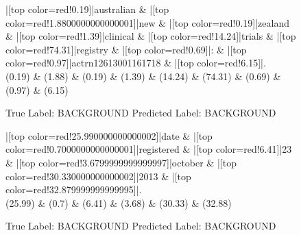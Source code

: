 \documentclass[a4paper, landscape]{article}
\begin{document}
\clearpage
\begin{figure}
\begin{center}
\begin{dependency}
\begin{deptext}
|[top color=red!0.19]|australian \& |[top color=red!1.8800000000000001]|new \& |[top color=red!0.19]|zealand \& |[top color=red!1.39]|clinical \& |[top color=red!14.24]|trials \& |[top color=red!74.31]|registry \& |[top color=red!0.69]|: \& |[top color=red!0.97]|actrn12613001161718 \& |[top color=red!6.15]|.\\
(0.19) \& (1.88) \& (0.19) \& (1.39) \& (14.24) \& (74.31) \& (0.69) \& (0.97) \& (6.15)\\
\end{deptext}
\end{dependency}
\end{center}
\caption{True Label: BACKGROUND Predicted Label: BACKGROUND}
\end{figure}
\clearpage
\begin{figure}
\begin{center}
\begin{dependency}
\begin{deptext}
|[top color=red!25.990000000000002]|date \& |[top color=red!0.7000000000000001]|registered \& |[top color=red!6.41]|23 \& |[top color=red!3.6799999999999997]|october \& |[top color=red!30.330000000000002]|2013 \& |[top color=red!32.879999999999995]|.\\
(25.99) \& (0.7) \& (6.41) \& (3.68) \& (30.33) \& (32.88)\\
\end{deptext}
\end{dependency}
\end{center}
\caption{True Label: BACKGROUND Predicted Label: BACKGROUND}
\end{figure}
\clearpage
\end{document}

